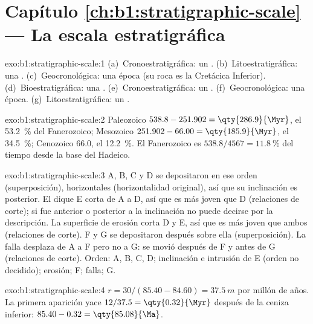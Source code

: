 \section*{Capítulo \ref{ch:b1:stratigraphic-scale} --- La escala estratigráfica}

\begin{solution}{exo:b1:stratigraphic-scale:1}
(a)~Cronoestratigráfica: un . (b)~Litoestratigráfica: una .
(c)~Geocronológica: una época (su roca es la  Cretácica Inferior).
(d)~Bioestratigráfica: una . (e)~Cronoestratigráfica: un .
(f)~Geocronológica: una época. (g)~Litoestratigráfica: un .
\end{solution}

\begin{solution}{exo:b1:stratigraphic-scale:2}
Paleozoico $538.8 - 251.902 = \qty{286.9}{\Myr}$, el \qty{53.2}{\%} del
Fanerozoico; Mesozoico $251.902 - 66.00 = \qty{185.9}{\Myr}$, el \qty{34.5}{\%};
Cenozoico \qty{66.0}{\Myr}, el \qty{12.2}{\%}. El Fanerozoico es
$538.8/4567 = \qty{11.8}{\%}$ del tiempo desde la base del Hadeico.
\end{solution}

\begin{solution}{exo:b1:stratigraphic-scale:3}
A, B, C y D se depositaron en ese orden (superposición), horizontales (horizontalidad original), así que su inclinación es posterior. El dique E corta de A a D, así que es más joven que D
(relaciones de corte); si fue anterior o posterior a la inclinación no puede decirse por la descripción. La superficie de erosión corta D y E, así que es más joven que ambos
(relaciones de corte). F y G se depositaron después sobre ella (superposición). La falla desplaza de A a F pero no a G: se movió después de F y antes de G
(relaciones de corte). Orden: A, B, C, D; inclinación e intrusión de E (orden no decidido); erosión; F; falla; G.
\end{solution}

\begin{solution}{exo:b1:stratigraphic-scale:4}
$r = 30/(85.40 - 84.60) = \qty{37.5}{m}$ por millón de años. La primera aparición
yace $12/37.5 = \qty{0.32}{\Myr}$ después de la ceniza inferior: $85.40 - 0.32 =
\qty{85.08}{\Ma}$.
\end{solution}

